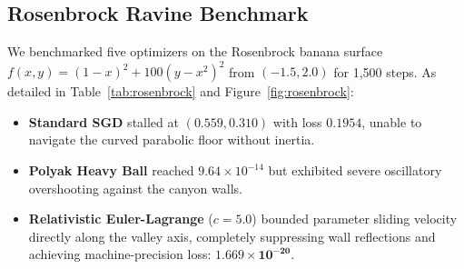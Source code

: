 \documentclass[10pt,twocolumn]{article}
\begin{document}
\subsection{Rosenbrock Ravine Benchmark}

We benchmarked five optimizers on the Rosenbrock banana surface $f(x, y) = (1-x)^2 + 100(y-x^2)^2$ from $(-1.5, 2.0)$ for 1,500 steps. As detailed in Table~\ref{tab:rosenbrock} and Figure~\ref{fig:rosenbrock}:

\begin{table}[h!]
\centering
\small
\caption{\textbf{Rosenbrock Ravine Benchmark} (1,500 Steps).}
\vspace{2mm}
\label{tab:rosenbrock}
\end{table}

\begin{itemize}
    \item \textbf{Standard SGD} stalled at $(0.559, 0.310)$ with loss $0.1954$, unable to navigate the curved parabolic floor without inertia.
    \item \textbf{Polyak Heavy Ball} reached $9.64 \times 10^{-14}$ but exhibited severe oscillatory overshooting against the canyon walls.
    \item \textbf{Relativistic Euler-Lagrange} ($c=5.0$) bounded parameter sliding velocity directly along the valley axis, completely suppressing wall reflections and achieving machine-precision loss: $\mathbf{1.669 \times 10^{-20}}$.
\end{itemize}
\end{document}
